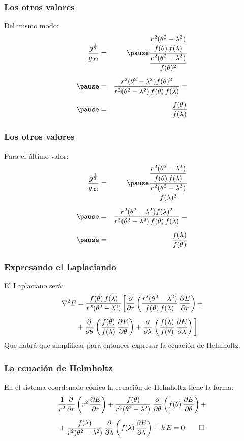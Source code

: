 \documentclass[12pt]{beamer}
\begin{document}
\begin{frame}
\frametitle{Los otros valores}
Del mismo modo:
\pause
\begin{eqnarray*}
\dfrac{g^{\frac{1}{2}}}{g_{22}} &=& \pause \dfrac{\dfrac{r^{2}(\theta^{2} - \lambda^{2})}{f(\theta) \, f(\lambda)}}{\dfrac{r^{2}(\theta^{2} - \lambda^{2})}{f(\theta)^{2}}} \\[0.5em] \pause
&=& \dfrac{r^{2}(\theta^{2} - \lambda^{2}) f(\theta)^{2}}{r^{2}(\theta^{2} - \lambda^{2}) \, f(\theta) \, f(\lambda)} = \\[0.5em] \pause
&=& \dfrac{f(\theta)}{f(\lambda)} 
\end{eqnarray*}
\end{frame}
\begin{frame}
\frametitle{Los otros valores}
Para el último valor:
\pause
\begin{eqnarray*}
\dfrac{g^{\frac{1}{2}}}{g_{33}} &=& \pause \dfrac{\dfrac{r^{2}(\theta^{2} - \lambda^{2})}{f(\theta) \, f(\lambda)}}{\dfrac{r^{2}(\theta^{2} - \lambda^{2})}{f(\lambda)^{2}}} \\[0.5em] \pause
&=& \dfrac{r^{2}(\theta^{2} - \lambda^{2}) f(\lambda)^{2}}{r^{2}(\theta^{2} - \lambda^{2}) \, f(\theta) \, f(\lambda)} = \\[0.5em] \pause
&=& \dfrac{f(\lambda)}{f(\theta)} 
\end{eqnarray*}
\end{frame}
\begin{frame}
\frametitle{Expresando el Laplaciando}
El Laplaciano será:
\pause
\begin{align*}
\laplacian{E} &= \dfrac{f(\theta) \, f(\lambda)}{r^{2} (\theta^{2} - \lambda^{2})} \bigg[ \pdv{r} \left( \dfrac{r^{2} (\theta^{2} - \lambda^{2})}{f(\theta) \, f(\lambda)} \, \pdv{E}{r} \right) + \\[0.5em]
&+ \pdv{\theta} \left( \dfrac{f(\theta)}{f(\lambda)} \, \pdv{E}{\theta} \right) + \pdv{\lambda} \left( \dfrac{f(\lambda)}{f(\theta)} \, \pdv{E}{\lambda} \right) \bigg]
\end{align*}
\pause
Que habrá que simplificar para entonces expresar la ecuación de Helmholtz.
\end{frame}
\begin{frame}
\frametitle{La ecuación de Helmholtz}
En el sistema coordenado cónico la ecuación de Helmholtz tiene la forma:
\begin{align*}
&\dfrac{1}{r^{2}} \pdv{r} \left( r^{2} \, \pdv{E}{r} \right) + \dfrac{f(\theta)}{r^{2} (\theta^{2} - \lambda^{2})} \, \pdv{\theta} \left( f(\theta) \, \pdv{E}{\theta} \right) + \\[0.5em]
&+ \dfrac{f(\lambda)}{r^{2} (\theta^{2} - \lambda^{2})} \, \pdv{\lambda} \left( f(\lambda) \, \pdv{E}{\lambda} \right) + k \, E = 0 \qed
\end{align*}
\end{frame}
\end{document}
